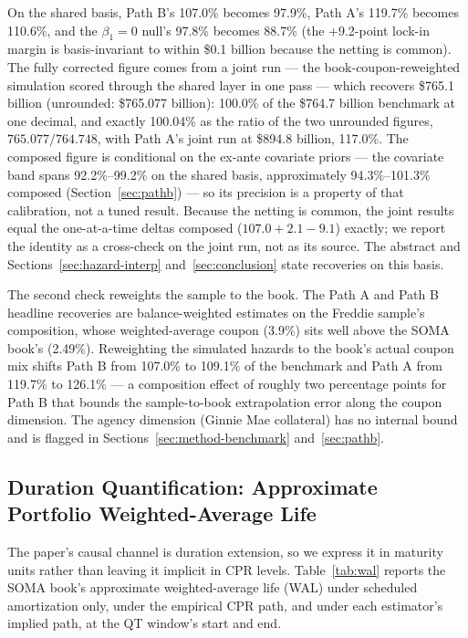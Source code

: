 \documentclass[12pt]{article}
\begin{document}
On the shared basis, Path B's 107.0\% becomes 97.9\%, Path A's 119.7\% becomes 110.6\%, and the $\beta_1 = 0$ null's 97.8\% becomes 88.7\% (the +9.2-point lock-in margin is basis-invariant to within \$0.1 billion because the netting is common). The fully corrected figure comes from a joint run --- the book-coupon-reweighted simulation scored through the shared layer in one pass --- which recovers \$765.1 billion (unrounded: \$765.077 billion): 100.0\% of the \$764.7 billion benchmark at one decimal, and exactly 100.04\% as the ratio of the two unrounded figures, $765.077/764.748$, with Path A's joint run at \$894.8 billion, 117.0\%. The composed figure is conditional on the ex-ante covariate priors --- the covariate band spans 92.2\%--99.2\% on the shared basis, approximately 94.3\%--101.3\% composed (Section~\ref{sec:pathb}) --- so its precision is a property of that calibration, not a tuned result. Because the netting is common, the joint results equal the one-at-a-time deltas composed ($107.0 + 2.1 - 9.1$) exactly; we report the identity as a cross-check on the joint run, not as its source. The abstract and Sections~\ref{sec:hazard-interp} and~\ref{sec:conclusion} state recoveries on this basis.

The second check reweights the sample to the book. The Path A and Path B headline recoveries are balance-weighted estimates on the Freddie sample's composition, whose weighted-average coupon (3.9\%) sits well above the SOMA book's (2.49\%). Reweighting the simulated hazards to the book's actual coupon mix shifts Path B from 107.0\% to 109.1\% of the benchmark and Path A from 119.7\% to 126.1\% --- a composition effect of roughly two percentage points for Path B that bounds the sample-to-book extrapolation error along the coupon dimension. The agency dimension (Ginnie Mae collateral) has no internal bound and is flagged in Sections~\ref{sec:method-benchmark} and~\ref{sec:pathb}.

\subsection{Duration Quantification: Approximate Portfolio Weighted-Average Life}\label{sec:robustness-wal}

The paper's causal channel is duration extension, so we express it in maturity units rather than leaving it implicit in CPR levels. Table~\ref{tab:wal} reports the SOMA book's approximate weighted-average life (WAL) under scheduled amortization only, under the empirical CPR path, and under each estimator's implied path, at the QT window's start and end.
\end{document}
